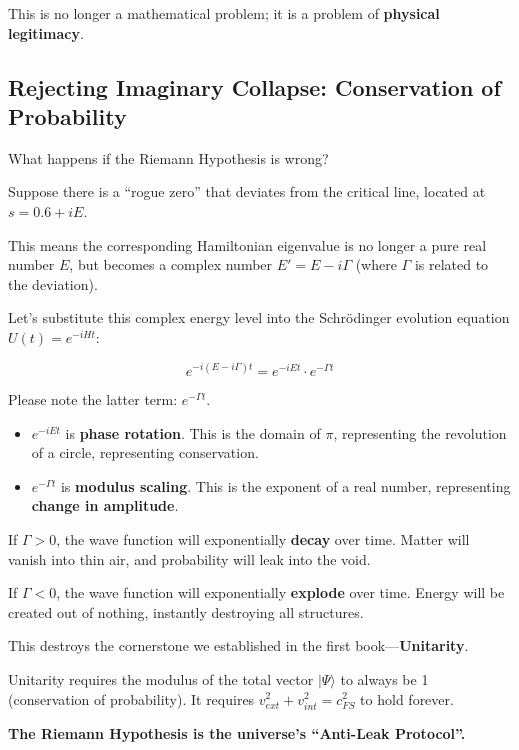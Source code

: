 This is no longer a mathematical problem; it is a problem of \textbf{physical legitimacy}.

\subsection{Rejecting Imaginary Collapse: Conservation of Probability}

What happens if the Riemann Hypothesis is wrong?

Suppose there is a ``rogue zero'' that deviates from the critical line, located at $s = 0.6 + iE$.

This means the corresponding Hamiltonian eigenvalue is no longer a pure real number $E$, but becomes a complex number $E' = E - i\Gamma$ (where $\Gamma$ is related to the deviation).

Let's substitute this complex energy level into the Schrödinger evolution equation $U(t) = e^{-iHt}$:

$$e^{-i(E - i\Gamma)t} = e^{-iEt} \cdot e^{-\Gamma t}$$

Please note the latter term: \textbf{$e^{-\Gamma t}$}.

\begin{itemize}
\item \textbf{$e^{-iEt}$} is \textbf{phase rotation}. This is the domain of $\pi$, representing the revolution of a circle, representing conservation.

\item \textbf{$e^{-\Gamma t}$} is \textbf{modulus scaling}. This is the exponent of a real number, representing \textbf{change in amplitude}.
\end{itemize}

If $\Gamma > 0$, the wave function will exponentially \textbf{decay} over time. Matter will vanish into thin air, and probability will leak into the void.

If $\Gamma < 0$, the wave function will exponentially \textbf{explode} over time. Energy will be created out of nothing, instantly destroying all structures.

This destroys the cornerstone we established in the first book—\textbf{Unitarity}.

Unitarity requires the modulus of the total vector $|\Psi\rangle$ to always be 1 (conservation of probability). It requires $v_{ext}^2 + v_{int}^2 = c_{FS}^2$ to hold forever.

\textbf{The Riemann Hypothesis is the universe's ``Anti-Leak Protocol''.}

